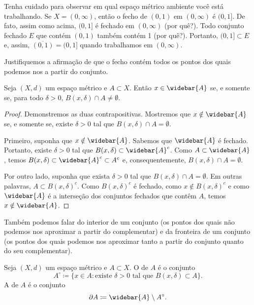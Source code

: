 \begin{example}
Tenha cuidado para observar em qual espaço métrico ambiente você está
trabalhando.
Se $X = (0,\infty)$, então o fecho de $(0,1)$ em $(0,\infty)$ é $(0,1]$.
De fato, assim como acima, $(0,1]$ é fechado em $(0,\infty)$ (por quê?).
Todo conjunto fechado $E$ que contém $(0,1)$ também contém 1 (por quê?).
Portanto, $(0,1] \subset E$ e, assim,
$\overline{(0,1)} = (0,1]$ quando trabalhamos em $(0,\infty)$.
\end{example}

Justifiquemos a afirmação de que o fecho contém todos os pontos dos quais
podemos nos  a partir do conjunto.

\begin{prop} \label{prop:msclosureappr}
Seja $(X,d)$ um espaço métrico e $A \subset X$. Então $x \in \widebar{A}$
se, e somente se, para todo $\delta > 0$, $B(x,\delta) \cap A \neq \emptyset$.
\end{prop}

\begin{proof}
Demonstremos as duas contrapositivas.
Mostremos que $x \notin \widebar{A}$ se, e somente se, existe
$\delta > 0$ tal que $B(x,\delta) \cap A = \emptyset$.

Primeiro, suponha que $x \notin \widebar{A}$. Sabemos que $\widebar{A}$ é
fechado. Portanto, existe $\delta > 0$ tal que
$B(x,\delta) \subset \widebar{A}^c$. Como $A \subset \widebar{A}$,
temos $B(x,\delta) \subset \widebar{A}^c \subset A^c$ e, consequentemente,
$B(x,\delta) \cap A = \emptyset$.

Por outro lado, suponha que exista $\delta > 0$ tal que
$B(x,\delta) \cap A = \emptyset$.
Em outras palavras,
$A \subset {B(x,\delta)}^c$.
Como ${B(x,\delta)}^c$ é fechado, como $x \not \in {B(x,\delta)}^c$
e como $\widebar{A}$ é a interseção dos conjuntos fechados que contêm $A$,
temos $x \notin \widebar{A}$.
\end{proof}

Também podemos falar do interior de um conjunto (os pontos dos quais não
podemos nos aproximar a partir do complementar) e da fronteira de um
conjunto (os pontos dos quais podemos nos aproximar tanto a partir do
conjunto quanto do seu complementar).

\begin{defn}
Seja $(X,d)$ um espaço métrico e $A \subset X$.
O \emph{} de $A$ é o conjunto
\begin{equation*}
A^\circ \coloneqq \{ x \in A : \text{existe } \delta > 0
\text{ tal que } B(x,\delta) \subset A \} .
\end{equation*}
A \emph{} de $A$ é o conjunto
\begin{equation*}
\partial A \coloneqq \widebar{A}\setminus A^\circ.
\end{equation*}
\end{defn}

